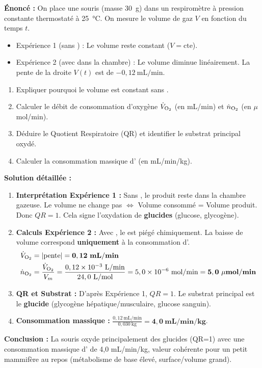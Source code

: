 \documentclass[11pt]{article}
\begin{document}
\begin{exoresolu}
    \textbf{Énoncé :} On place une souris (masse \SI{30}{g}) dans un respiromètre à pression constante thermostaté à \SI{25}{\celsius}. On mesure le volume de gaz $V$ en fonction du temps $t$.
    \begin{itemize}
        \item Expérience 1 (sans ) : Le volume reste constant ($V = \text{cte}$).
        \item Expérience 2 (avec  dans la chambre) : Le volume diminue linéairement. La pente de la droite $V(t)$ est de $-0,12\ \text{mL/min}$.
    \end{itemize}
    \begin{enumerate}
        \item Expliquer pourquoi le volume est constant sans .
        \item Calculer le débit de consommation d'oxygène $\dot{V}_{\ce{O2}}$ (en mL/min) et $\dot{n}_{\ce{O2}}$ (en $\mu$mol/min).
        \item Déduire le Quotient Respiratoire (QR) et identifier le substrat principal oxydé.
        \item Calculer la consommation massique d' (en mL/min/kg).
    \end{enumerate}
    \tcblower
    \textbf{Solution détaillée :}
    \begin{enumerate}
        \item \textbf{Interprétation Expérience 1 :} Sans , le  produit reste dans la chambre gazeuse. Le volume ne change pas $\iff$ Volume  consommé = Volume  produit. Donc $QR = 1$. Cela signe l'oxydation de \textbf{glucides} (glucose, glycogène).
        \item \textbf{Calculs Expérience 2 :} Avec , le  est piégé chimiquement. La baisse de volume correspond \textbf{uniquement} à la consommation d'.
              \begin{align*}
                  \dot{V}_{\ce{O2}} &= |\text{pente}| = \mathbf{0,12\ mL/min} \\
                  \dot{n}_{\ce{O2}} &= \frac{\dot{V}_{\ce{O2}}}{V_m} = \frac{0,12 \times 10^{-3}\ \text{L/min}}{24,0\ \text{L/mol}} = 5,0 \times 10^{-6}\ \text{mol/min} = \mathbf{5,0\ \mu mol/min}
              \end{align*}
        \item \textbf{QR et Substrat :} D'après Expérience 1, $QR = 1$. Le substrat principal est le \textbf{glucide} (glycogène hépatique/musculaire, glucose sanguin).
        \item \textbf{Consommation massique :} $\frac{0,12\ \text{mL/min}}{0,030\ \text{kg}} = \mathbf{4,0\ mL/min/kg}$.
    \end{enumerate}
    \textbf{Conclusion :} La souris oxyde principalement des glucides (QR=1) avec une consommation massique d' de 4,0 mL/min/kg, valeur cohérente pour un petit mammifère au repos (métabolisme de base élevé, surface/volume grand).
\end{exoresolu}
\end{document}

